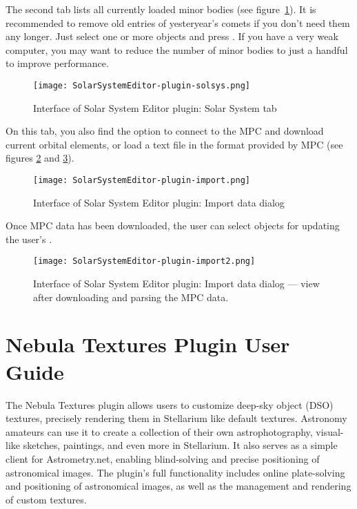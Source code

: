 The second tab lists all currently loaded minor bodies (see figure~\ref{fig:SolarSystemEditor:SolarSystem}).  It is recommended
to remove old entries of yesteryear's comets if you don't need them any
longer. Just select one or more objects and press .
If you have a very weak computer, you may want to reduce the number of
minor bodies to just a handful to improve performance.

\begin{figure}[tbh]\centering
	\texttt{[image: SolarSystemEditor-plugin-solsys.png]}
	\caption{Interface of Solar System Editor plugin: Solar System tab}
	\label{fig:SolarSystemEditor:SolarSystem}
\end{figure}

On this tab, you also find the option to connect to the MPC and download current orbital elements, 
or load a text file in the format provided by MPC (see figures \ref{fig:SolarSystemEditor:ImportData:InitialView} and \ref{fig:SolarSystemEditor:ImportData:FinalView}). 

\begin{figure}[tbph]\centering
\texttt{[image: SolarSystemEditor-plugin-import.png]}
\caption{Interface of Solar System Editor plugin: Import data dialog}
\label{fig:SolarSystemEditor:ImportData:InitialView}
\end{figure}

Once MPC data has been downloaded, the user can select objects for updating the user's .

\begin{figure}[tbph]\centering
\texttt{[image: SolarSystemEditor-plugin-import2.png]}
\caption{Interface of Solar System Editor plugin: Import data dialog --- view after downloading and parsing the MPC data.}
\label{fig:SolarSystemEditor:ImportData:FinalView}
\end{figure}

\newpage


\clearpage

\section{Nebula Textures Plugin User Guide}
\label{sec:plugins:NebulaTextures}

The Nebula Textures plugin allows users to customize deep-sky object (DSO) textures, precisely 
rendering them in Stellarium like default textures. Astronomy amateurs can use it to create 
a collection of their own astrophotography, visual-like sketches, paintings, and even more in 
Stellarium. It also serves as a simple client for Astrometry.net, enabling blind-solving and precise 
positioning of astronomical images. The plugin's full functionality includes online plate-solving 
and positioning of astronomical images, as well as the management and rendering of custom textures.

